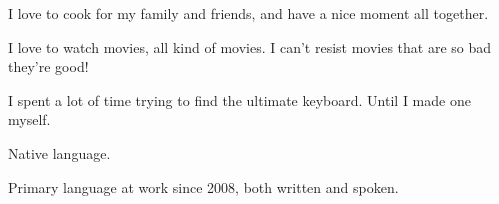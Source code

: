 \begin{rubric}{%
}
\entry*[Cooking] I love to cook for my family and friends, and have a nice moment all together.


\entry*[Movies] I love to watch movies, all kind of movies. I can't resist movies that are so bad they're good!

 I spent a lot of time trying to find the ultimate keyboard. Until I made one myself.


\entry*[French] Native language.

\entry*[English] Primary language at work since 2008, both written and spoken.

\end{rubric}


